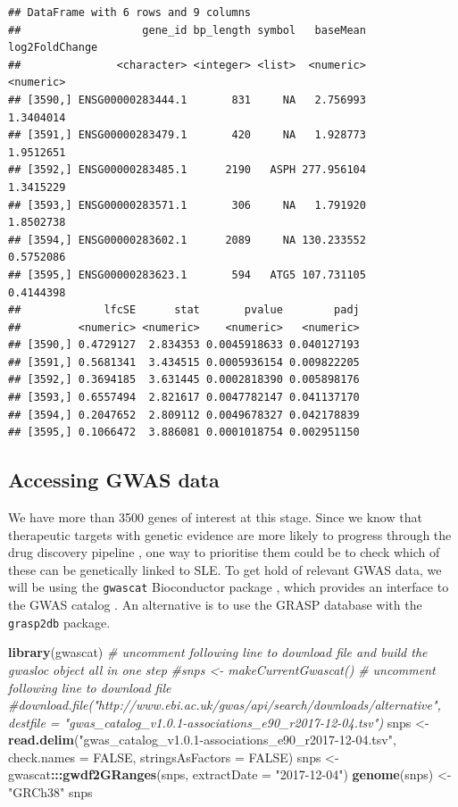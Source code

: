 \documentclass[9pt,a4paper,]{extarticle}
\newenvironment{Shaded}{\begin{snugshade}}{\end{snugshade}}
\newcommand{\KeywordTok}[1]{\textcolor[rgb]{0.13,0.29,0.53}{\textbf{#1}}}
\newcommand{\DataTypeTok}[1]{\textcolor[rgb]{0.13,0.29,0.53}{#1}}
\newcommand{\StringTok}[1]{\textcolor[rgb]{0.31,0.60,0.02}{#1}}
\newcommand{\CommentTok}[1]{\textcolor[rgb]{0.56,0.35,0.01}{\textit{#1}}}
\newcommand{\OtherTok}[1]{\textcolor[rgb]{0.56,0.35,0.01}{#1}}
\newcommand{\OperatorTok}[1]{\textcolor[rgb]{0.81,0.36,0.00}{\textbf{#1}}}
\newcommand{\NormalTok}[1]{#1}
\begin{document}
\begin{verbatim}
## DataFrame with 6 rows and 9 columns
##                   gene_id bp_length symbol   baseMean log2FoldChange
##               <character> <integer> <list>  <numeric>      <numeric>
## [3590,] ENSG00000283444.1       831     NA   2.756993      1.3404014
## [3591,] ENSG00000283479.1       420     NA   1.928773      1.9512651
## [3592,] ENSG00000283485.1      2190   ASPH 277.956104      1.3415229
## [3593,] ENSG00000283571.1       306     NA   1.791920      1.8502738
## [3594,] ENSG00000283602.1      2089     NA 130.233552      0.5752086
## [3595,] ENSG00000283623.1       594   ATG5 107.731105      0.4144398
##             lfcSE      stat       pvalue        padj
##         <numeric> <numeric>    <numeric>   <numeric>
## [3590,] 0.4729127  2.834353 0.0045918633 0.040127193
## [3591,] 0.5681341  3.434515 0.0005936154 0.009822205
## [3592,] 0.3694185  3.631445 0.0002818390 0.005898176
## [3593,] 0.6557494  2.821617 0.0047782147 0.041137170
## [3594,] 0.2047652  2.809112 0.0049678327 0.042178839
## [3595,] 0.1066472  3.886081 0.0001018754 0.002951150
\end{verbatim}

\subsection{Accessing GWAS data}\label{accessing-gwas-data}

We have more than 3500 genes of interest at this stage.
Since we know that therapeutic targets with genetic evidence are more likely to progress through the drug discovery pipeline \citep{Nelson2015}, one way to prioritise them could be to check which of these can be genetically linked to SLE.
To get hold of relevant GWAS data, we will be using the \texttt{gwascat} Bioconductor package \citep{Carey2017a}, which provides an interface to the GWAS catalog \citep{MacArthur2017}.
An alternative is to use the GRASP \citep{Eicher2015} database with the \texttt{grasp2db} \citep{Carey2017b} package.

\begin{Shaded}
\begin{Highlighting}[]
\KeywordTok{library}\NormalTok{(gwascat)}
\CommentTok{# uncomment following line to download file and build the gwasloc object all in one step}
\CommentTok{#snps <- makeCurrentGwascat()}
\CommentTok{# uncomment following line to download file}
\CommentTok{#download.file("http://www.ebi.ac.uk/gwas/api/search/downloads/alternative", destfile = "gwas_catalog_v1.0.1-associations_e90_r2017-12-04.tsv")}
\NormalTok{snps <-}\StringTok{ }\KeywordTok{read.delim}\NormalTok{(}\StringTok{"gwas_catalog_v1.0.1-associations_e90_r2017-12-04.tsv"}\NormalTok{, }\DataTypeTok{check.names =} \OtherTok{FALSE}\NormalTok{, }\DataTypeTok{stringsAsFactors =} \OtherTok{FALSE}\NormalTok{)}
\NormalTok{snps <-}\StringTok{ }\NormalTok{gwascat}\OperatorTok{:::}\KeywordTok{gwdf2GRanges}\NormalTok{(snps, }\DataTypeTok{extractDate =} \StringTok{"2017-12-04"}\NormalTok{)}
\KeywordTok{genome}\NormalTok{(snps) <-}\StringTok{ "GRCh38"}
\NormalTok{snps}
\end{Highlighting}
\end{Shaded}
\end{document}
